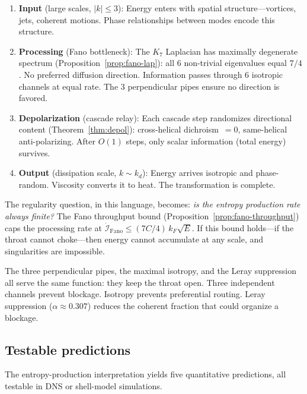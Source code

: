 \documentclass[11pt]{article}
\theoremstyle{definition}
\theoremstyle{remark}
\begin{document}
\begin{enumerate}
  \item \textbf{Input} (large scales, $|k| \leq 3$):
    Energy enters with spatial structure---vortices, jets,
    coherent motions. Phase relationships between modes
    encode this structure.

  \item \textbf{Processing} (Fano bottleneck):
    The $K_7$ Laplacian has maximally degenerate spectrum
    (Proposition~\ref{prop:fano-lap}): all 6 non-trivial
    eigenvalues equal $7/4$. No preferred diffusion direction.
    Information passes through 6 isotropic channels at equal rate.
    The 3 perpendicular pipes ensure no direction is favored.

  \item \textbf{Depolarization} (cascade relay):
    Each cascade step randomizes directional content
    (Theorem~\ref{thm:depol}): cross-helical dichroism~$= 0$,
    same-helical anti-polarizing. After $O(1)$ steps,
    only scalar information (total energy) survives.

  \item \textbf{Output} (dissipation scale, $k \sim k_d$):
    Energy arrives isotropic and phase-random.
    Viscosity converts it to heat.
    The transformation is complete.
\end{enumerate}

The regularity question, in this language, becomes:
\emph{is the entropy production rate always finite?}
The Fano throughput bound
(Proposition~\ref{prop:fano-throughput}) caps the processing
rate at $\dot{\mathcal{I}}_{\mathrm{Fano}}
\leq (7C/4)\, k_F \sqrt{E}$.
If this bound holds---if the throat cannot choke---then
energy cannot accumulate at any scale, and singularities
are impossible.

The three perpendicular pipes, the maximal isotropy,
and the Leray suppression all serve the same function:
they keep the throat open. Three independent channels
prevent blockage. Isotropy prevents preferential routing.
Leray suppression ($\alpha \approx 0.307$) reduces the
coherent fraction that could organize a blockage.

\subsection{Testable predictions}\label{sec:tests}

The entropy-production interpretation yields five
quantitative predictions, all testable in DNS or
shell-model simulations.
\end{document}
